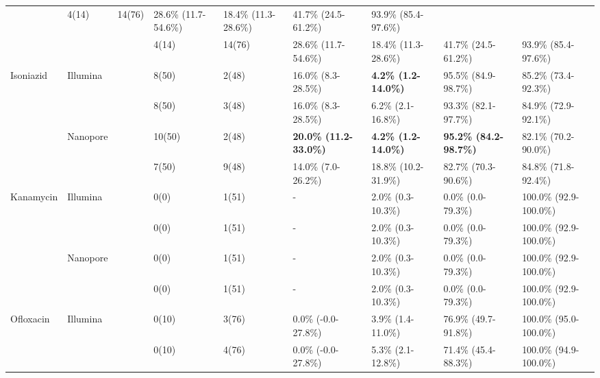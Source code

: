\begin{table}
{\begin{tabular}{@{}lllllllll@{}}
  \drprg{} &
  4(14) &
  14(76) &
  28.6\% (11.7-54.6\%) &
  18.4\% (11.3-28.6\%) &
  41.7\% (24.5-61.2\%) &
  93.9\% (85.4-97.6\%) \\
     &                           & \mykrobe{} & 4(14) & 14(76) & 28.6\% (11.7-54.6\%)          & 18.4\% (11.3-28.6\%) & 41.7\% (24.5-61.2\%) & 93.9\% (85.4-97.6\%)   \\ \cmidrule(l){3-9} 
\multirow{4}{*}{Isoniazid} &
  \multirow{2}{*}{Illumina} &
  \drprg{} &
  8(50) &
  2(48) &
  16.0\% (8.3-28.5\%) &
  \textbf{4.2\% (1.2-14.0\%)} &
  95.5\% (84.9-98.7\%) &
  85.2\% (73.4-92.3\%) \\
     &                           & \mykrobe{} & 8(50) & 3(48)  & 16.0\% (8.3-28.5\%)           & 6.2\% (2.1-16.8\%)   & 93.3\% (82.1-97.7\%) & 84.9\% (72.9-92.1\%)   \\
 &
  \multirow{2}{*}{Nanopore} &
  \drprg{} &
  10(50) &
  2(48) &
  \textbf{20.0\% (11.2-33.0\%)} &
  \textbf{4.2\% (1.2-14.0\%)} &
  \textbf{95.2\% (84.2-98.7\%)} &
  82.1\% (70.2-90.0\%) \\
     &                           & \mykrobe{} & 7(50) & 9(48)  & 14.0\% (7.0-26.2\%)           & 18.8\% (10.2-31.9\%) & 82.7\% (70.3-90.6\%) & 84.8\% (71.8-92.4\%)   \\ \cmidrule(l){3-9} 
\multirow{4}{*}{Kanamycin} &
  \multirow{2}{*}{Illumina} &
  \drprg{} &
  0(0) &
  1(51) &
  - &
  2.0\% (0.3-10.3\%) &
  0.0\% (0.0-79.3\%) &
  100.0\% (92.9-100.0\%) \\
     &                           & \mykrobe{} & 0(0)  & 1(51)  & -                             & 2.0\% (0.3-10.3\%)   & 0.0\% (0.0-79.3\%)   & 100.0\% (92.9-100.0\%) \\
     & \multirow{2}{*}{Nanopore} & \drprg{}   & 0(0)  & 1(51)  & -                             & 2.0\% (0.3-10.3\%)   & 0.0\% (0.0-79.3\%)   & 100.0\% (92.9-100.0\%) \\
     &                           & \mykrobe{} & 0(0)  & 1(51)  & -                             & 2.0\% (0.3-10.3\%)   & 0.0\% (0.0-79.3\%)   & 100.0\% (92.9-100.0\%) \\ \cmidrule(l){3-9} 
\multirow{4}{*}{Ofloxacin} &
  \multirow{2}{*}{Illumina} &
  \drprg{} &
  0(10) &
  3(76) &
  0.0\% (-0.0-27.8\%) &
  3.9\% (1.4-11.0\%) &
  76.9\% (49.7-91.8\%) &
  100.0\% (95.0-100.0\%) \\
     &                           & \mykrobe{} & 0(10) & 4(76)  & 0.0\% (-0.0-27.8\%)           & 5.3\% (2.1-12.8\%)   & 71.4\% (45.4-88.3\%) & 100.0\% (94.9-100.0\%) \\

\end{tabular}}
\end{table}
